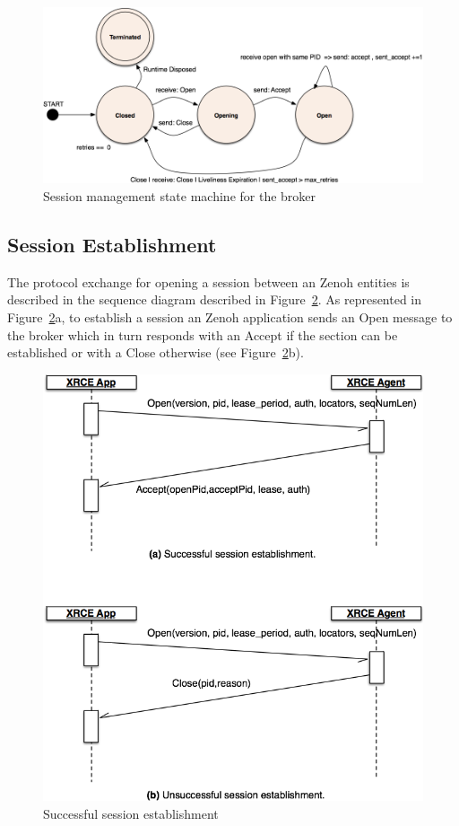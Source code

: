 \documentclass[a4paper,oneside,article]{memoir}
\begin{document}
\begin{figure}
\centering
\includegraphics[scale=0.3]{session-acceptor.png}
\caption{Session management state machine for the broker}\label{fig:session-acceptor}
\end{figure}

\subsection{Session Establishment}

The protocol exchange for opening a session between an Zenoh entities is described in the sequence
diagram described in Figure~\ref{fig:open-session}.  As represented in
Figure~\ref{fig:open-session}a, to establish a session an Zenoh application sends an Open message to
the broker which in turn responds with an Accept if the section can be established or with a Close
otherwise (see Figure~\ref{fig:open-session}b).

\begin{figure}
\centering
\includegraphics[scale=0.3]{open-session.png}
\caption{Successful session establishment}\label{fig:open-session}
\end{figure}
\end{document}
